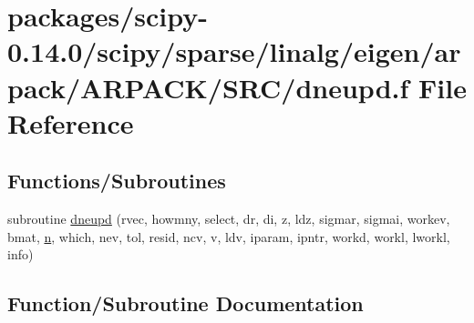 \hypertarget{dneupd_8f}{}\section{packages/scipy-\/0.14.0/scipy/sparse/linalg/eigen/arpack/\+A\+R\+P\+A\+C\+K/\+S\+R\+C/dneupd.f File Reference}
\label{dneupd_8f}
\subsection*{Functions/\+Subroutines}
\begin{DoxyCompactItemize}
\item 
subroutine \hyperlink{dneupd_8f_a4f5394fd20470d66a8ffe42c0c4e385e}{dneupd} (rvec, howmny, select, dr, di, z, ldz, sigmar, sigmai, workev, bmat, \hyperlink{indexexpr_8h_ab427e2e2b4d6cec55fa088ea2a692ace}{n}, which, nev, tol, resid, ncv, v, ldv, iparam, ipntr, workd, workl, lworkl, info)
\end{DoxyCompactItemize}


\subsection{Function/\+Subroutine Documentation}
\hypertarget{dneupd_8f_a4f5394fd20470d66a8ffe42c0c4e385e}{}
